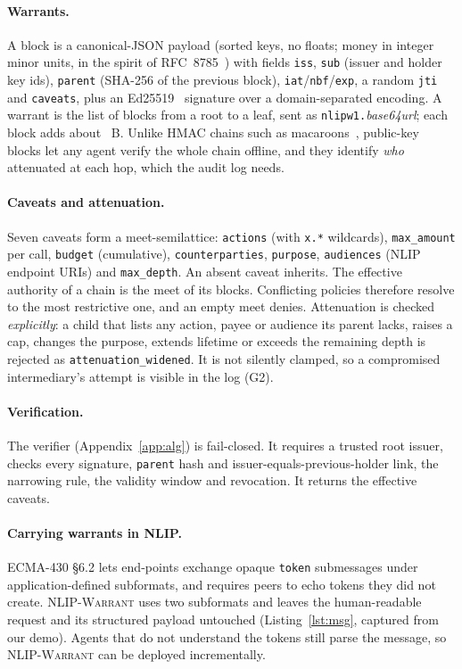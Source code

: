 \documentclass[sigconf,nonacm]{acmart}
\newcommand{\sys}{\textsc{NLIP-Warrant}}
\newcommand{\code}[1]{\texttt{\small #1}}
\begin{document}
\paragraph{Warrants.} A block is a canonical-JSON payload (sorted keys, no floats; money in integer minor units, in the spirit of RFC~8785~\cite{rfc8785}) with fields \code{iss}, \code{sub} (issuer and holder key ids), \code{parent} (SHA-256 of the previous block), \code{iat}/\code{nbf}/\code{exp}, a random \code{jti} and \code{caveats}, plus an Ed25519~\cite{rfc8032} signature over a domain-separated encoding. A warrant is the list of blocks from a root to a leaf, sent as \code{nlipw1.}\textit{base64url}; each block adds about \resPerHopBytes{}~B. Unlike HMAC chains such as macaroons~\cite{macaroons}, public-key blocks let any agent verify the whole chain offline, and they identify \emph{who} attenuated at each hop, which the audit log needs.

\paragraph{Caveats and attenuation.} Seven caveats form a meet-semilattice: \code{actions} (with \code{x.*} wildcards), \code{max\_amount} per call, \code{budget} (cumulative), \code{counterparties}, \code{purpose}, \code{audiences} (NLIP endpoint URIs) and \code{max\_depth}. An absent caveat inherits. The effective authority of a chain is the meet of its blocks. Conflicting policies therefore resolve to the most restrictive one, and an empty meet denies. Attenuation is checked \emph{explicitly}: a child that lists any action, payee or audience its parent lacks, raises a cap, changes the purpose, extends lifetime or exceeds the remaining depth is rejected as \code{attenuation\_widened}. It is not silently clamped, so a compromised intermediary's attempt is visible in the log (G2).

\paragraph{Verification.} The verifier (Appendix~\ref{app:alg}) is fail-closed. It requires a trusted root issuer, checks every signature, \code{parent} hash and issuer-equals-previous-holder link, the narrowing rule, the validity window and revocation. It returns the effective caveats.

\paragraph{Carrying warrants in NLIP.} ECMA-430 §6.2 lets end-points exchange opaque \code{token} submessages under application-defined subformats, and requires peers to echo tokens they did not create. \sys{} uses two subformats and leaves the human-readable request and its structured payload untouched (Listing~\ref{lst:msg}, captured from our demo). Agents that do not understand the tokens still parse the message, so \sys{} can be deployed incrementally.
\end{document}
